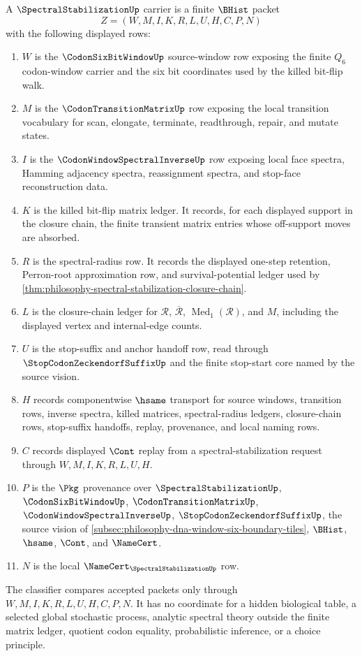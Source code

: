 \begin{definition}
\label{def:spectral-stabilization-carrier}
A $\SpectralStabilizationUp$ carrier is a finite $\BHist$ packet
$$
Z=(W,M,I,K,R,L,U,H,C,P,N)
$$
with the following displayed rows:
\begin{enumerate}
\item $W$ is the $\CodonSixBitWindowUp$ source-window row exposing the finite $Q_{6}$ codon-window carrier and the six bit coordinates used by the killed bit-flip walk.
\item $M$ is the $\CodonTransitionMatrixUp$ row exposing the local transition vocabulary for scan, elongate, terminate, readthrough, repair, and mutate states.
\item $I$ is the $\CodonWindowSpectralInverseUp$ row exposing local face spectra, Hamming adjacency spectra, reassignment spectra, and stop-face reconstruction data.
\item $K$ is the killed bit-flip matrix ledger. It records, for each displayed support in the closure chain, the finite transient matrix entries whose off-support moves are absorbed.
\item $R$ is the spectral-radius row. It records the displayed one-step retention, Perron-root approximation row, and survival-potential ledger used by \autoref{thm:philosophy-spectral-stabilization-closure-chain}.
\item $L$ is the closure-chain ledger for $\mathcal{R}$, $\overline{\mathcal{R}}$, $\operatorname{Med}_{1}(\mathcal{R})$, and $M$, including the displayed vertex and internal-edge counts.
\item $U$ is the stop-suffix and anchor handoff row, read through $\StopCodonZeckendorfSuffixUp$ and the finite stop-start core named by the source vision.
\item $H$ records componentwise $\hsame$ transport for source windows, transition rows, inverse spectra, killed matrices, spectral-radius ledgers, closure-chain rows, stop-suffix handoffs, replay, provenance, and local naming rows.
\item $C$ records displayed $\Cont$ replay from a spectral-stabilization request through $W,M,I,K,R,L,U,H$.
\item $P$ is the $\Pkg$ provenance over $\SpectralStabilizationUp$, $\CodonSixBitWindowUp$, $\CodonTransitionMatrixUp$, $\CodonWindowSpectralInverseUp$, $\StopCodonZeckendorfSuffixUp$, the source vision of \autoref{subsec:philosophy-dna-window-six-boundary-tiles}, $\BHist$, $\hsame$, $\Cont$, and $\NameCert$.
\item $N$ is the local $\NameCert_{\SpectralStabilizationUp}$ row.
\end{enumerate}
The classifier compares accepted packets only through $W,M,I,K,R,L,U,H,C,P,N$. It has no coordinate for a hidden biological table, a selected global stochastic process, analytic spectral theory outside the finite matrix ledger, quotient codon equality, probabilistic inference, or a choice principle.
\end{definition}

